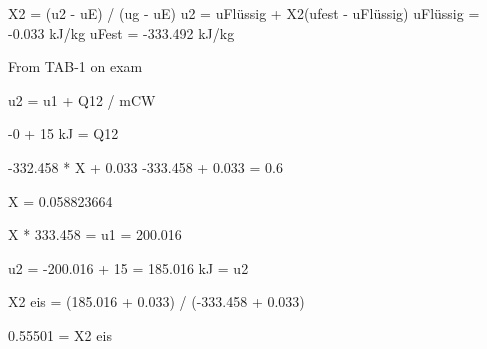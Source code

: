 X2 = (u2 - uE) / (ug - uE)  
u2 = uFlüssig + X2(ufest - uFlüssig)  
uFlüssig = -0.033 kJ/kg  
uFest = -333.492 kJ/kg  

From TAB-1 on exam  

u2 = u1 + Q12 / mCW  

-0 + 15 kJ = Q12  

-332.458 * X + 0.033  
-333.458 + 0.033 = 0.6  

X = 0.058823664  

X * 333.458 = u1 = 200.016  

u2 = -200.016 + 15 = 185.016 kJ = u2  

X2 eis = (185.016 + 0.033) / (-333.458 + 0.033)  

0.55501 = X2 eis